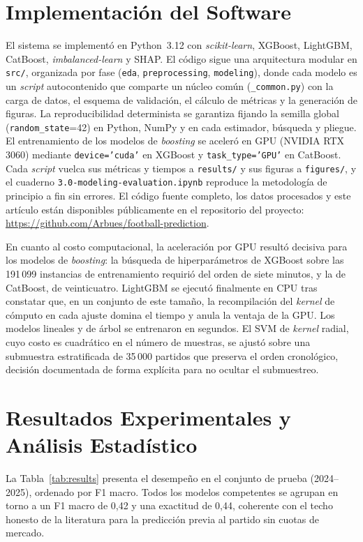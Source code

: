 \documentclass[conference]{IEEEtran}
\begin{document}
\section{Implementaci\'on del Software}\label{sec:software}
El sistema se implement\'o en Python~3.12 con \emph{scikit-learn}, XGBoost, LightGBM,
CatBoost, \emph{imbalanced-learn} y SHAP. El c\'odigo sigue una arquitectura modular en
\texttt{src/}, organizada por fase (\texttt{eda}, \texttt{preprocessing}, \texttt{modeling}),
donde cada modelo es un \emph{script} autocontenido que comparte un n\'ucleo com\'un
(\texttt{\_common.py}) con la carga de datos, el esquema de validaci\'on, el c\'alculo de
m\'etricas y la generaci\'on de figuras. La reproducibilidad determinista se garantiza
fijando la semilla global (\texttt{random\_state}=42) en Python, NumPy y en cada estimador,
b\'usqueda y pliegue. El entrenamiento de los modelos de \emph{boosting} se aceler\'o en
GPU (NVIDIA RTX 3060) mediante \texttt{device='cuda'} en XGBoost y \texttt{task\_type='GPU'}
en CatBoost. Cada \emph{script} vuelca sus m\'etricas y tiempos a \texttt{results/} y sus
figuras a \texttt{figures/}, y el cuaderno \texttt{3.0-modeling-evaluation.ipynb} reproduce
la metodolog\'ia de principio a fin sin errores. El c\'odigo fuente completo, los datos
procesados y este art\'iculo est\'an disponibles p\'ublicamente en el repositorio del
proyecto: \url{https://github.com/Arbues/football-prediction}.

En cuanto al costo computacional, la aceleraci\'on por GPU result\'o decisiva para los
modelos de \emph{boosting}: la b\'usqueda de hiperpar\'ametros de XGBoost sobre las 191\,099
instancias de entrenamiento requiri\'o del orden de siete minutos, y la de CatBoost, de
veinticuatro. LightGBM se ejecut\'o finalmente en CPU tras constatar que, en un conjunto de
este tama\~no, la recompilaci\'on del \emph{kernel} de c\'omputo en cada ajuste domina el
tiempo y anula la ventaja de la GPU. Los modelos lineales y de \'arbol se entrenaron en
segundos. El SVM de \emph{kernel} radial, cuyo costo es cuadr\'atico en el n\'umero de
muestras, se ajust\'o sobre una submuestra estratificada de 35\,000 partidos que preserva el
orden cronol\'ogico, decisi\'on documentada de forma expl\'icita para no ocultar el
submuestreo.

\section{Resultados Experimentales y An\'alisis Estad\'istico}\label{sec:results}
La Tabla~\ref{tab:results} presenta el desempe\~no en el conjunto de prueba (2024--2025),
ordenado por F1 macro. Todos los modelos competentes se agrupan en torno a un F1 macro de
0,42 y una exactitud de 0,44, coherente con el techo honesto de la literatura para la
predicci\'on previa al partido sin cuotas de mercado.
\end{document}
